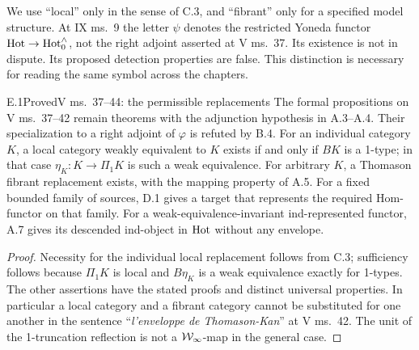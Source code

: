 
We use ``local'' only in the sense of C.3, and ``fibrant'' only for a specified model structure. At IX ms.~9 the letter $\psi$ denotes the restricted Yoneda functor $\mathrm{Hot}\to\mathrm{Hot}_0^{\wedge}$, not the right adjoint asserted at V ms.~37. Its existence is not in dispute. Its proposed detection properties are false. This distinction is necessary for reading the same symbol across the chapters.

\begin{claim}{E.1}{Proved}{V ms.~37--44: the permissible replacements}
The formal propositions on V ms.~37--42 remain theorems with the adjunction hypothesis in A.3--A.4. Their specialization to a right adjoint of $\varphi$ is refuted by B.4. For an individual category $K$, a local category weakly equivalent to $K$ exists if and only if $BK$ is a 1-type; in that case $\eta_K:K\to\Pi_1K$ is such a weak equivalence. For arbitrary $K$, a Thomason fibrant replacement exists, with the mapping property of A.5. For a fixed bounded family of sources, D.1 gives a target that represents the required Hom-functor on that family. For a weak-equivalence-invariant ind-represented functor, A.7 gives its descended ind-object in $\mathrm{Hot}$ without any envelope.
\end{claim}
\begin{proof}
Necessity for the individual local replacement follows from C.3; sufficiency follows because $\Pi_1K$ is local and $B\eta_K$ is a weak equivalence exactly for 1-types. The other assertions have the stated proofs and distinct universal properties. In particular a local category and a fibrant category cannot be substituted for one another in the sentence ``\emph{l'enveloppe de Thomason-Kan}'' at V ms.~42. The unit of the 1-truncation reflection is not a $\mathcal W_\infty$-map in the general case.
\end{proof}

